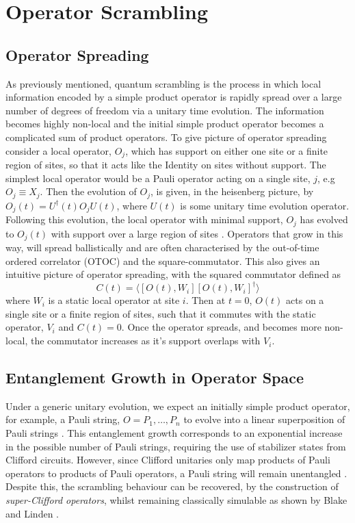 \section{Operator Scrambling}
\subsection{Operator Spreading}

As previously mentioned, quantum scrambling is the process in which local information
encoded by a simple product operator is rapidly spread over a large number of degrees of freedom via a unitary time evolution.
The information becomes highly non-local and the initial simple product operator becomes a complicated sum of product
operators. To give picture of operator spreading consider a local operator,
$O_j$, which has support on either one site or a finite region of sites, so that it acts like the Identity on
sites without support. The simplest local operator would be a Pauli operator acting on a single site, $j$, e.g
$O_j \equiv X_j$. Then the evolution of
$O_j$, is given, in the heisenberg picture, by $O_j(t) = U^{\dagger}(t)O_jU(t)$, where $U(t)$ is some unitary time evolution
operator. Following this evolution, the local operator with minimal support, $O_j$ has evolved to $O_j(t)$ with support over a
large region of sites \cite{Khemani_2018}. Operators that grow in this way, will spread ballistically \cite{Roberts_2015, Lieb:1972wy, Schuster_2022} and are often
characterised by the out-of-time ordered correlator (OTOC) \cite{Xu2022} and the square-commutator\cite{Blake_2018}. This also gives an
intuitive picture of operator spreading, with the squared commutator defined as
\begin{equation}
    C(t) = \langle [O(t), W_i][O(t), W_i]^{\dagger}\rangle
\end{equation}
where $W_i$ is a static local operator at site $i$\cite{https://doi.org/10.48550/arxiv.1804.08655}. Then at $t=0$, $O(t)$
acts on a single site or a finite region of sites, such that it commutes with the static operator, $V_i$ and $C(t) = 0$.
Once the operator spreads, and becomes more non-local, the commutator increases as it's support overlaps with $V_i$.


\subsection{Entanglement Growth in Operator Space}
Under a generic unitary evolution, we expect an initially simple product operator, for example, a Pauli string, $O = P_1, \dots, P_n$
to evolve into a linear superposition of Pauli strings \cite{Roberts_2018, Nahum_2017}. This entanglement growth corresponds to
an exponential increase in the possible number of Pauli strings, requiring the use of stabilizer states from Clifford circuits.
However, since Clifford unitaries only map products of Pauli operators to products of Pauli operators, a Pauli string
will remain unentangled \cite{Nahum_2018}. Despite this, the scrambling behaviour can be recovered, by the construction
of \textit{super-Clifford operators}, whilst remaining classically simulable as shown by Blake and Linden \cite{Blake2020}.

